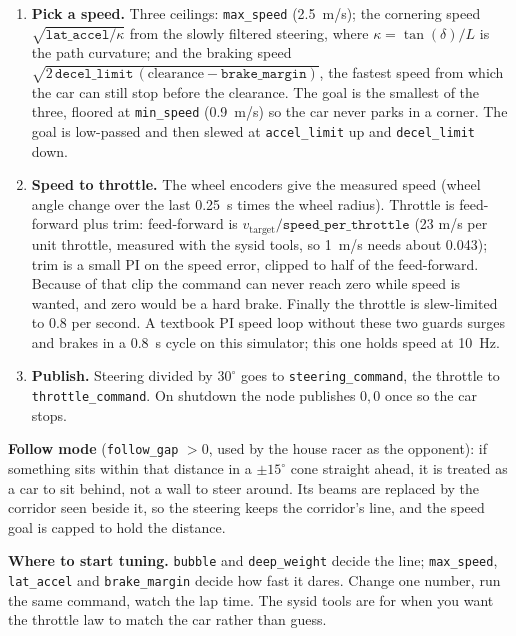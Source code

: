 \begin{enumerate}[leftmargin=*]
  would spoil, but close to it. It is low-passed, except that a genuinely close obstacle
  (under \texttt{brake\_margin} $+0.3$~m) passes straight through so braking is immediate.
  \item \textbf{Pick a speed.} Three ceilings: \texttt{max\_speed} (2.5~m/s); the cornering
  speed $\sqrt{\texttt{lat\_accel}/\kappa}$ from the slowly filtered steering, where
  $\kappa=\tan(\delta)/L$ is the path curvature; and the braking speed
  $\sqrt{2\,\texttt{decel\_limit}\,(\mathrm{clearance}-\texttt{brake\_margin})}$, the fastest speed
  from which the car can still stop before the clearance. The goal is the smallest of the
  three, floored at \texttt{min\_speed} (0.9~m/s) so the car never parks in a corner. The goal
  is low-passed and then slewed at \texttt{accel\_limit} up and \texttt{decel\_limit} down.
  \item \textbf{Speed to throttle.} The wheel encoders give the measured speed (wheel angle
  change over the last 0.25~s times the wheel radius). Throttle is feed-forward plus trim:
  feed-forward is $v_{\mathrm{target}}/\texttt{speed\_per\_throttle}$ (23 m/s per unit throttle,
  measured with the sysid tools, so 1~m/s needs about 0.043); trim is a small PI on the speed
  error, clipped to half of the feed-forward. Because of that clip the command can never reach
  zero while speed is wanted, and zero would be a hard brake. Finally the throttle is
  slew-limited to 0.8 per second. A textbook PI speed loop without these two guards surges and
  brakes in a 0.8~s cycle on this simulator; this one holds speed at 10~Hz.
  \item \textbf{Publish.} Steering divided by $30^\circ$ goes to \texttt{steering\_command},
  the throttle to \texttt{throttle\_command}. On shutdown the node publishes $0, 0$ once so the
  car stops.
\end{enumerate}

\textbf{Follow mode} (\texttt{follow\_gap} $> 0$, used by the house racer as the opponent):
if something sits within that distance in a $\pm 15^\circ$ cone straight ahead, it is treated
as a car to sit behind, not a wall to steer around. Its beams are replaced by the corridor seen
beside it, so the steering keeps the corridor's line, and the speed goal is capped to hold the
distance.

\textbf{Where to start tuning.} \texttt{bubble} and \texttt{deep\_weight} decide the line;
\texttt{max\_speed}, \texttt{lat\_accel} and \texttt{brake\_margin} decide how fast it dares.
Change one number, run the same command, watch the lap time. The sysid tools are for when
you want the throttle law to match the car rather than guess.

